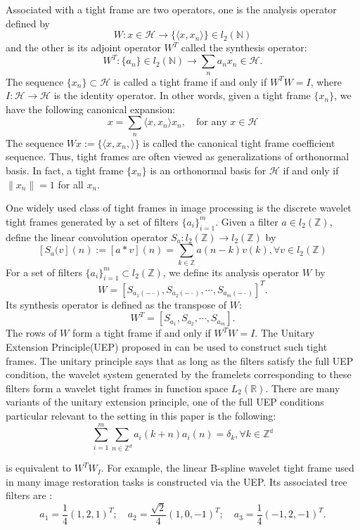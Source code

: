 \documentclass[a4paper]{article}
\begin{document}
Associated with a tight frame are two operators, one is the analysis operator defined by 
\[
	W: x\in \mathcal{H} \rightarrow \{\langle x,x_n\rangle\} \in l_2(\mathbb{N})
\]
and the other is its adjoint operator $W^T$ called the synthesis operator:
\[
	W^T : \{a_n\} \in l_2(\mathbb{N}) \rightarrow \sum_n a_n x_n\in \mathcal{H}.
\]
The sequence $\{x_n\}\subset\mathcal{H}$ is called a tight frame if and only if $W^TW=I$, where $I: \mathcal{H} \rightarrow \mathcal{H}$ is the identity operator. In other words, given a tight frame $\{x_n\}$, we have the following canonical expansion:
\[
	x=\sum_n \langle x,x_n\rangle x_n, \quad \textrm{for any } x\in \mathcal{H}
\]
The sequence $Wx:=\{\langle x,x_n,\rangle \}$ is called the canonical tight frame coefficient sequence. Thus, tight frames are often viewed as generalizations of orthonormal basis. In fact, a tight frame $\{x_n\}$ is an orthonormal basis for $\mathcal{H}$ if and only if $\|x_n\|=1$ for all $x_n$.

One widely used class of tight frames in image processing is the discrete wavelet tight frames generated by a set of filters $\{a_i\}_{i=1}^m$. Given a filter $a\in l_2(\mathbb{Z})$, define the linear convolution operator $S_a: l_2(\mathbb{Z}) \rightarrow l_2(\mathbb{Z})$ by 
\[
[S_a(v](n):=[a*v](n)=\sum_{k\in\mathbb{Z}}a(n-k)v(k), \forall v\in l_2(\mathbb{Z})
\]
For a set of filters $\{a_i\}_{i=1}^m\subset l_2(\mathbb{Z})$, we define its analysis operator $W$ by 
\[
	W=[S_{a_1(-\cdot)},S_{a_2(-\cdot)},\cdots,S_{a_m(-\cdot)}]^T.
\]
Its synthesis operator is defined as the transpose of $W$:
\[
	W^T=[S_{a_1},S_{a_2},\cdots, S_{a_m}].
\]
The rows of $W$ form a tight frame if and only if $W^TW=I$. The Unitary Extension Principle(UEP) proposed in  can be used to construct such tight frames. The unitary principle says that as long as the filters satisfy the full UEP condition, the wavelet system generated by the framelets corresponding to these filters form a wavelet tight frames in function space $L_2(\mathbb{R})$. There are many variants of the unitary extension principle, one of the full UEP conditions particular relevant to the setting in this paper is the following:
\begin{equation}
\label{eq:uep}
	\sum_{i=1}^m \sum_{n\in \mathbb{Z}^d} a_i(k+n) a_i(n)=\delta_k, \forall k\in \mathbb{Z^d}	
\end{equation}


is equivalent to $W^TW_I$. For example,  the linear B-spline wavelet tight frame used in many image restoration tasks is constructed via the UEP. Its associated tree filters are :
\[
	a_1=\frac{1}{4}(1,2,1)^T; \quad a_2=\frac{\sqrt{2}}{4}(1,0,-1)^T; \quad a_3=\frac{1}{4}(-1,2,-1)^T.
\]
\end{document}
